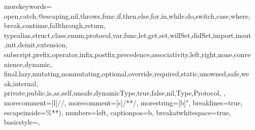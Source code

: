 
\usepackage{listings}

 {
  morekeywords={
    open,catch,@escaping,nil,throws,func,if,then,else,for,in,while,do,switch,case,where,break,continue,fallthrough,return,
    typealias,struct,class,enum,protocol,var,func,let,get,set,willSet,didSet,import,inout,init,deinit,extension,
    subscript,prefix,operator,infix,postfix,precedence,associativity,left,right,none,convenience,dynamic,
    final,lazy,mutating,nonmutating,optional,override,required,static,unowned,safe,weak,internal,
    private,public,is,as,self,unsafe,dynamicType,true,false,nil,Type,Protocol,
  },
  morecomment=[l]{//},
  morecomment=[s]{/*}{*/},
  morestring=[b]",
  breaklines=true,
  escapeinside={\%*}{*)},
  numbers=left,
  captionpos=b,
  breakatwhitespace=true,
  basicstyle=\linespread{1.0}\ttfamily\footnotesize, %
}


\usepackage{caption}




\usepackage{fancyhdr}
\pagestyle{fancy}
\fancyhead{}
\fancyfoot{} 
\renewcommand{\headrulewidth}{0.4pt} %
\renewcommand{\footrulewidth}{0.0pt} %

\renewcommand{\chaptermark}[1]{\markboth{\thechapter\quad#1}{}}
\renewcommand{\sectionmark}[1]{\markright{\thesection\quad#1}}

